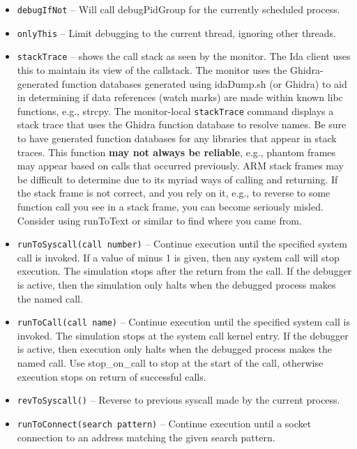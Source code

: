 \documentclass[titlepage]{article}
\begin{document}
\begin{itemize}
\item {\tt debugIfNot} -- Will call debugPidGroup for the currently scheduled process.

\item {\tt onlyThis} -- Limit debugging to the current thread, ignoring other threads.

\item {\tt stackTrace} – shows the call stack as seen by the monitor.  The Ida client uses this to maintain its view of the callstack.  The monitor
uses the Ghidra-generated function databases generated using idaDump.sh (or Ghidra) to aid in determining if 
data references (watch marks) are made within known libc functions, e.g., strcpy.  The monitor-local {\tt stackTrace} command displays a
stack trace that uses the Ghidra function database to resolve names.  Be sure to have generated function databases for any libraries that appear in stack traces.
This function \textbf{may not always be reliable}, e.g., phantom frames may appear based on calls that occurred previously. ARM stack frames may be
difficult to determine due to its myriad ways of calling and returning. If the stack frame is not correct, and you rely on it, e.g., to reverse to some function
call you see in a stack frame, you can become seriously misled.  Consider using runToText or similar to find where you came from.

\item {\tt runToSyscall(call number)} – Continue execution until the specified system call is invoked.  If a value of minus 1 is given, then any system call will stop execution.  The simulation stops after the return from the call.  If the debugger is active, then the simulation only halts when the debugged process makes the named call.

\item {\tt runToCall(call name)} – Continue execution until the specified system call is invoked.  The simulation stops at the system call kernel entry.
If the debugger is active, then execution only halts when the debugged process makes the named call.  Use stop\_on\_call to stop at the start of the call,
otherwise execution stops on return of successful calls.

\item {\tt revToSyscall()} -- Reverse to previous syscall made by the current process.

\item {\tt runToConnect(search pattern)} – Continue execution until a socket connection to an address matching the given search pattern.


\end{itemize}
\end{document}
